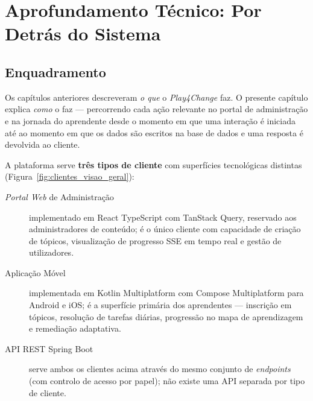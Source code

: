 %
%
%
\chapter{Aprofundamento Técnico: Por Detrás do Sistema}
\label{cha:deepdive}

\section{Enquadramento}
\label{sec:deepdive_enquadramento}

Os capítulos anteriores descreveram \emph{o que} o \textit{Play4Change} faz.
O presente capítulo explica \emph{como} o faz — percorrendo cada ação
relevante no portal de administração e na jornada do aprendente desde o
momento em que uma interação é iniciada até ao momento em que os dados
são escritos na base de dados e uma resposta é devolvida ao cliente.

A plataforma serve \textbf{três tipos de cliente} com superfícies
tecnológicas distintas (Figura~\ref{fig:clientes_visao_geral}):

\begin{description}
  \item[\textit{Portal Web} de Administração] implementado em React
    TypeScript com TanStack Query, reservado aos administradores de
    conteúdo; é o único cliente com capacidade de criação de tópicos,
    visualização de progresso SSE em tempo real e gestão de utilizadores.

  \item[Aplicação Móvel] implementada em Kotlin Multiplatform com Compose
    Multiplatform para Android e iOS; é a superfície primária dos
    aprendentes — inscrição em tópicos, resolução de tarefas diárias,
    progressão no mapa de aprendizagem e remediação adaptativa.

  \item[API REST Spring Boot] serve ambos os clientes acima através do
    mesmo conjunto de \textit{endpoints} (com controlo de acesso por
    papel); não existe uma API separada por tipo de cliente.
\end{description}

